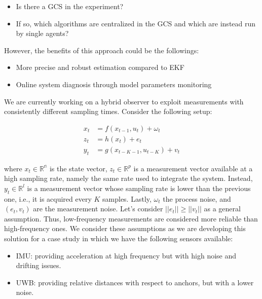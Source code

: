 \begin{itemize}
    \item Is there a GCS in the experiment?
    \item If so, which algorithms are centralized in the GCS and which are instead run by single agents?    
\end{itemize}

However, the benefits of this approach could be the followings:

\begin{itemize}
    \item More precise and robust estimation compared to EKF
    \item Online system diagnosis through model parameters monitoring
\end{itemize}

\newline
We are currently working on a hybrid observer to exploit measurements with consistently different sampling times. Consider the following setup: 

\begin{subequations}
    \label{eqn:multirate_ss}
    \begin{align}
        x_t &= f(x_{t-1},u_t) + \omega_t \\
        z_t &= h(x_t) + e_t \\
        y_{t} &= g(x_{t-K-1},u_{t-K}) + v_t
    \end{align}
\end{subequations}

where $x_t\in\mathbb{R^n}$ is the state vector, $z_t\in\mathbb{R}^p$ is a measurement vector available at a high sampling rate, namely the same rate used to integrate the system. Instead, $y_t\in\mathbb{R}^l$ is a measurement vector whose sampling rate is lower than the previous one, i.e., it is acquired every $K$ samples. Lastly, $\omega_t$ the process noise, and $(e_t,v_t)$ are the measurement noise. Let's consider $||e_t|| \geq ||v_t||$ as a general assumption. Thus, low-frequency measurements are considered more reliable than high-frequency ones. We consider these assumptions as we are developing this solution for a case study in which we have the following sensors available: 

\begin{itemize}
    \item IMU: providing acceleration at high frequency but with high noise and drifting issues.
    \item UWB: providing relative distances with respect to anchors, but with a lower noise.
\end{itemize}

